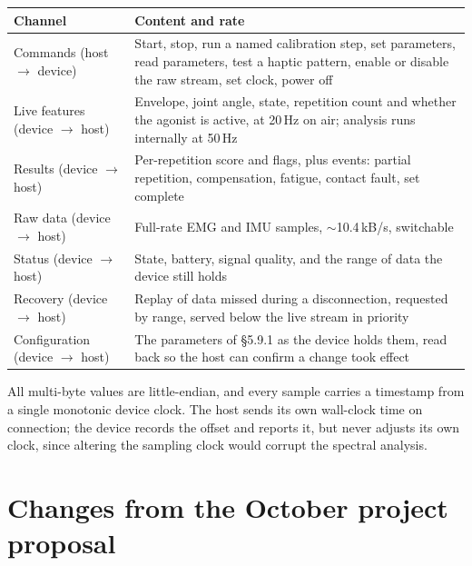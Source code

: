 \documentclass[11pt]{article}
\begin{document}
\begin{table}[H]
\centering\small
\begin{tabularx}{\linewidth}{@{}p{34mm} X@{}}
\toprule
\textbf{Channel} & \textbf{Content and rate} \\
\midrule
Commands (host $\rightarrow$ device) & Start, stop, run a named calibration step, set parameters, read parameters, test a haptic pattern, enable or disable the raw stream, set clock, power off \\
Live features (device $\rightarrow$ host) & Envelope, joint angle, state, repetition count and whether the agonist is active, at 20\,Hz on air; analysis runs internally at 50\,Hz \\
Results (device $\rightarrow$ host) & Per-repetition score and flags, plus events: partial repetition, compensation, fatigue, contact fault, set complete \\
Raw data (device $\rightarrow$ host) & Full-rate EMG and IMU samples, $\sim$10.4\,kB/s, switchable \\
Status (device $\rightarrow$ host) & State, battery, signal quality, and the range of data the device still holds \\
Recovery (device $\rightarrow$ host) & Replay of data missed during a disconnection, requested by range, served below the live stream in priority \\
Configuration (device $\rightarrow$ host) & The parameters of \S5.9.1 as the device holds them, read back so the host can confirm a change took effect \\
\bottomrule
\end{tabularx}
\end{table}

\noindent
All multi-byte values are little-endian, and every sample carries a timestamp
from a single monotonic device clock. The host sends its own wall-clock time on
connection; the device records the offset and reports it, but never adjusts its
own clock, since altering the sampling clock would corrupt the spectral analysis.

\section{Changes from the October project proposal}
\end{document}
